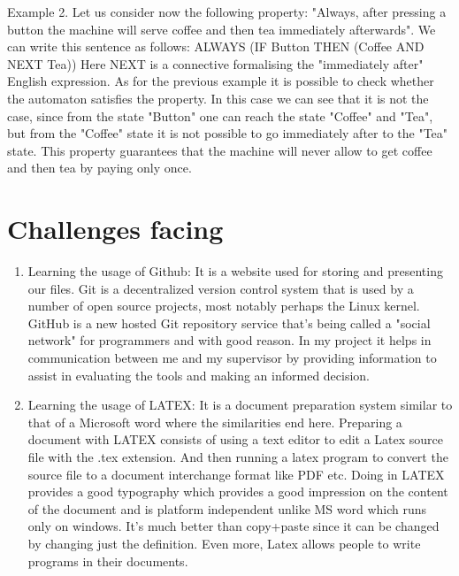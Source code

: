 \documentclass{article}
\begin{document}
Example 2.
Let us consider now the following property: "Always, after pressing a button the machine will serve coffee and then tea immediately afterwards". We can write this sentence as follows:
ALWAYS (IF Button THEN (Coffee AND NEXT Tea))
Here NEXT is a connective formalising the "immediately after" English expression. As for the previous example it is possible to check whether the automaton satisfies the property. In this case we can see that it is not the case, since from the state "Button" one can reach the state "Coffee" and "Tea", but from the "Coffee" state it is not possible to go immediately after to the "Tea" state. This property guarantees that the machine will never allow to get coffee and then tea by paying only once.


\section{Challenges facing}

\begin{enumerate}

\item Learning the usage of Github: It is a website used for storing and presenting our files. Git is a decentralized version control system that is used by a number of open source projects, most notably perhaps the Linux kernel. GitHub is a new hosted Git repository service that's being called a "social network" for programmers and with good reason. In my project it helps in communication between me and my supervisor by providing information to assist in evaluating the tools and making an informed decision.

\item Learning the usage of LATEX: It is a document preparation system similar to that of a Microsoft word where the similarities end here. Preparing a document with LATEX consists of using a text editor to edit a Latex source file with the .tex extension. And then running a latex program to convert the source file to a document interchange format like PDF etc. Doing in LATEX provides a good typography which provides a good impression on the content of the document and is platform independent unlike MS word which runs only on windows. It's much better than copy+paste since it can be changed by changing just the definition. Even more, Latex allows people to write programs in their documents. 

\end{enumerate}
\end{document}
